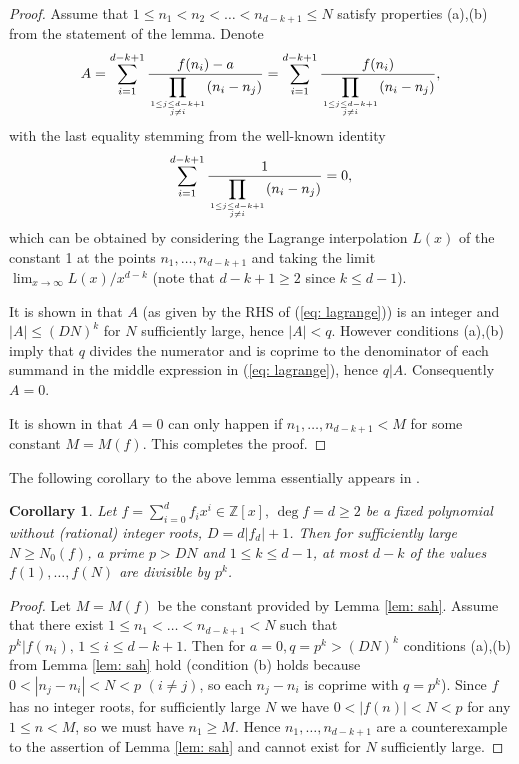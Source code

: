 \documentclass[alphabetic]{amsart}
\newtheorem{cor}[claim]{Corollary}
\theoremstyle{definition}
\numberwithin{equation}{section}
\newcommand{\Z}{{\mathbb Z}}
\numberwithin{equation}{section}
\begin{document}
\begin{proof}

Assume that $1\le n_1<n_2<\ldots<n_{d-k+1}\le N$ satisfy properties (a),(b) from the statement of the lemma. Denote \begin{equation}\label{eq: lagrange}A=\sum_{i=1}^{d-k+1}\frac{f(n_i)-a}{\displaystyle\prod_{1\le j\le d-k+1\atop{j\neq i}}(n_i-n_j)}=\sum_{i=1}^{d-k+1}\frac{f(n_i)}{\displaystyle\prod_{1\le j\le d-k+1\atop{j\neq i}}(n_i-n_j)},\end{equation} 
with the last equality stemming from the well-known identity
$$\sum_{i=1}^{d-k+1}\frac{1}{\displaystyle\prod_{1\le j\le d-k+1\atop{j\neq i}}(n_i-n_j)}=0,$$
which can be obtained by considering the Lagrange interpolation $L(x)$ of the constant 1 at the points $n_1,\ldots,n_{d-k+1}$ and taking the limit $\lim_{x\to\infty}L(x)/x^{d-k}$ (note that $d-k+1\ge 2$ since $k\le d-1$).

It is shown in \cite[Proof of Lemma 4.1]{Sah20} that $A$ (as given by the RHS of (\ref{eq: lagrange})) is an integer and $|A|\le (DN)^k$ for $N$ sufficiently large, hence $|A|<q$. However conditions (a),(b) imply that $q$ divides the numerator and is coprime to the denominator of each summand in the middle expression in (\ref{eq: lagrange}), hence $q|A$. Consequently $A=0$.

It is shown in \cite[Proof of Lemma 4.1]{Sah20} that $A=0$ can only happen if $n_1,\ldots,n_{d-k+1}< M$ for some constant $M=M(f)$. This completes the proof.
\end{proof}

The following corollary to the above lemma essentially appears in \cite{Sah20}.

\begin{cor}\label{cor: sah} Let $f=\sum_{i=0}^df_ix^i\in\Z[x],\,\deg f=d\ge 2$ be a fixed polynomial without (rational) integer roots, $D=d|f_d|+1$. Then for sufficiently large $N\ge N_0(f)$, a prime $p>DN$ and $1\le k\le d-1$, at most $d-k$ of the values $f(1),\ldots,f(N)$ are divisible by $p^k$.\end{cor}

\begin{proof} Let $M=M(f)$ be the constant provided by Lemma \ref{lem: sah}. Assume that there exist $1\le n_1<\ldots<n_{d-k+1}<N$ such that $p^k|f(n_i),\,1\le i\le d-k+1$. Then for $a=0,q=p^k>(DN)^k$ conditions (a),(b) from Lemma \ref{lem: sah} hold (condition (b) holds because $0<|n_j-n_i|<N<p\,\,(i\neq j)$, so each $n_j-n_i$ is coprime with $q=p^k$). Since $f$ has no integer roots, for sufficiently large $N$ we have $0<|f(n)|<N<p$ for any $1\le n<M$, so we must have $n_1\ge M$. Hence $n_1,\ldots,n_{d-k+1}$ are a counterexample to the assertion of Lemma \ref{lem: sah} and cannot exist for $N$ sufficiently large.\end{proof}
\end{document}
